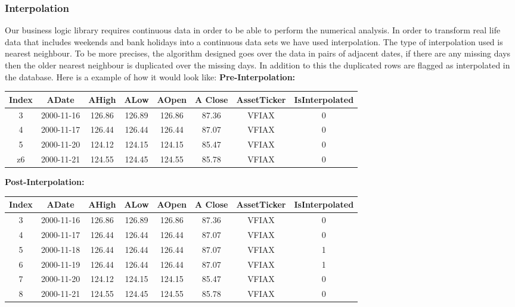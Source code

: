 \documentclass[main.tex]{subfiles}
\begin{document}
\subsubsection{Interpolation}
Our business logic library requires continuous data in order to be able to perform the numerical analysis. In order to transform real life data that includes weekends and bank holidays into a continuous data sets we have used interpolation. The type of interpolation used is nearest neighbour. To be more precises, the algorithm designed goes over the data in pairs of adjacent dates, if there are any missing days then the older nearest neighbour is duplicated over the missing days. In addition to this the duplicated rows are flagged as interpolated in the database. Here is a example of how it would look like:
\textbf{\newline Pre-Interpolation: }
\begin{center}
 \begin{tabular}{||c c c c c c c c||} 
 \hline
 Index & ADate & AHigh & ALow & AOpen &A Close&AssetTicker&IsInterpolated\\ [0.5ex] 
 \hline\hline
 3&2000-11-16&126.86&126.89&126.86&87.36&VFIAX&0 \\ 
 \hline
 4&2000-11-17&126.44&126.44&126.44&87.07&VFIAX&0\\
 \hline
 5&2000-11-20&124.12&124.15&124.15&85.47&VFIAX&0\\ 
 \hline
 z6&2000-11-21&124.55&124.45&124.55&85.78&VFIAX&0\\
 \hline
\end{tabular}
\end{center}

\textbf{\newline Post-Interpolation: }
\begin{center}
 \begin{tabular}{||c c c c c c c c||} 
 \hline
 Index & ADate & AHigh & ALow & AOpen &A Close&AssetTicker&IsInterpolated\\ [0.5ex] 
 \hline\hline
 3&2000-11-16&126.86&126.89&126.86&87.36&VFIAX&0 \\ 
 \hline
 4&2000-11-17&126.44&126.44&126.44&87.07&VFIAX&0\\
 \hline
 5&2000-11-18&126.44&126.44&126.44&87.07&VFIAX&1
 \\
 \hline
 6&2000-11-19&126.44&126.44&126.44&87.07&VFIAX&1 \\
 \hline
7&2000-11-20&124.12&124.15&124.15&85.47&VFIAX&0\\ 
\hline
8&2000-11-21&124.55&124.45&124.55&85.78&VFIAX&0\\
 \hline
\end{tabular}
\end{center}
\end{document}
